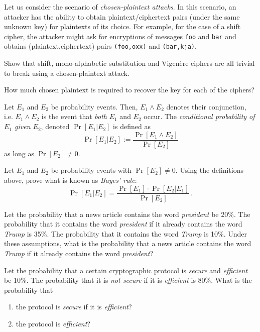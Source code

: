 \documentclass[a4paper,10pt,landscape,twocolumn]{scrartcl}
\begin{document}
\begin{exercise}
Let us consider the scenario of \emph{chosen-plaintext attacks}. In this scenario, an attacker has the ability to obtain plaintext/ciphertext pairs (under the same unknown key) for plaintexts of its choice. For example, for the case of a shift cipher, the attacker might ask for encryptions of messages \texttt{foo} and \texttt{bar} and obtains (plaintext,ciphertext) pairs \texttt{(foo,oxx)} and \texttt{(bar,kja)}.

\begin{subex}
Show that shift, mono-alphabetic substitution and Vigen{\`e}re ciphers are all trivial to break using a chosen-plaintext attack.
\end{subex}

\begin{subex}
How much chosen plaintext is required to recover the key for each of the ciphers?
\end{subex}
\end{exercise}



\begin{exercise}
Let $E_1$ and $E_2$ be probability events. Then, $E_1 \wedge E_2$ denotes their conjunction, i.e. $E_1
    \wedge E_2$ is the event that \emph{both} $E_1$ and $E_2$ occur. The
    \emph{conditional probability of $E_1$ given $E_2$}, denoted
    $\Pr[E_1 | E_2]$ is defined as
    \[ \Pr[E_1 | E_2] := \frac{ \Pr[E_1 \wedge E_2] }{\Pr[E_2]} \]
    as long as $\Pr[E_2] \neq 0$.

\begin{subex}
Let $E_1$ and $E_2$ be probability events with $\Pr[E_2] \neq 0$. Using the definitions above, prove what is known as \emph{Bayes' rule}:
\[ \Pr[E_1 | E_2] = \frac{ \Pr[E_1] \cdot \Pr[E_2 | E_1] }{\Pr[E_2]} \, . \]
\end{subex}

\begin{subex} Let the probability that a news article contains the word
    \emph{president} be 20\%. The probability that it contains the word
    \emph{president} if it already contains the word \emph{Trump} is
    35\%. The probability that it contains the word \emph{Trump} is 10\%.
    Under these assumptions, what is the probability that a news article
    contains the word \emph{Trump} if it already contains the word \emph{president}?
\end{subex}

\begin{subex} Let the probability that a certain cryptographic protocol is
    \emph{secure} and \emph{efficient} be 10\%. The probability that it is
    \emph{not secure} if it is \emph{efficient} is 80\%. What is the
    probability that
    \begin{enumerate}
      \item the protocol is \emph{secure} if it is \emph{efficient}?
      \item the protocol is \emph{efficient}?
    \end{enumerate}
\end{subex}

\end{exercise}
\end{document}
